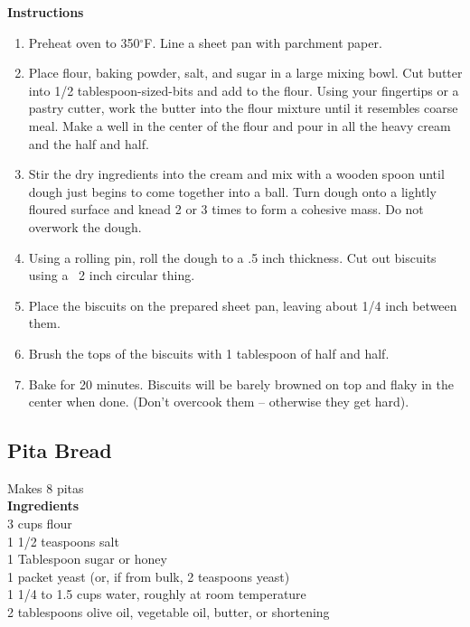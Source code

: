 \documentclass{article}
\numberwithin{figure}{section}
\numberwithin{equation}{section}
\begin{document}
{\bf Instructions}
\begin{enumerate}
\item Preheat oven to 350$^\circ$F. Line a sheet pan with parchment paper.

\item Place flour, baking powder, salt, and sugar in a large mixing bowl. Cut butter into 1/2 tablespoon-sized-bits and add to the flour. Using your fingertips or a pastry cutter, work the butter into the flour mixture until it resembles coarse meal. Make a well in the center of the flour and pour in all the heavy cream and the half and half.

\item Stir the dry ingredients into the cream and mix with a wooden spoon until dough just begins to come together into a ball. Turn dough onto a lightly floured surface and knead 2 or 3 times to form a cohesive mass. Do not overwork the dough.

\item Using a rolling pin, roll the dough to a .5 inch thickness.  Cut out biscuits using a ~2 inch circular thing.

\item Place the biscuits on the prepared sheet pan, leaving about 1/4 inch between them.

\item Brush the tops of the biscuits with 1 tablespoon of half and half.

\item Bake for 20 minutes. Biscuits will be barely browned on top and flaky in the center when done. (Don't overcook them – otherwise they get hard).
\end{enumerate}


\pagebreak
\subsection{Pita Bread}
Makes 8 pitas\\

{\bf Ingredients}\\
3 cups flour\\
1 1/2 teaspoons salt\\
1 Tablespoon sugar or honey\\
1 packet yeast (or, if from bulk, 2 teaspoons yeast)\\
1 1/4 to 1.5 cups water, roughly at room temperature\\
2 tablespoons olive oil, vegetable oil, butter, or shortening\\
\end{document}
